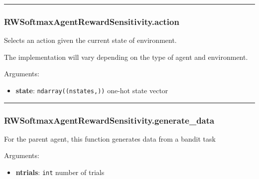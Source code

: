 \begin{center}\rule{0.5\linewidth}{\linethickness}\end{center}

\hypertarget{rwsoftmaxagentrewardsensitivity.action}{%
\subsubsection{RWSoftmaxAgentRewardSensitivity.action}\label{rwsoftmaxagentrewardsensitivity.action}}

\begin{Shaded}
\begin{Highlighting}[]
\end{Highlighting}
\end{Shaded}

Selects an action given the current state of environment.

The implementation will vary depending on the type of agent and
environment.

Arguments:

\begin{itemize}
\tightlist
\item
  \textbf{state}: \texttt{ndarray((nstates,))} one-hot state vector
\end{itemize}

\begin{center}\rule{0.5\linewidth}{\linethickness}\end{center}

\hypertarget{rwsoftmaxagentrewardsensitivity.generate_data}{%
\subsubsection{RWSoftmaxAgentRewardSensitivity.generate\_data}\label{rwsoftmaxagentrewardsensitivity.generate_data}}

\begin{Shaded}
\begin{Highlighting}[]
\end{Highlighting}
\end{Shaded}

For the parent agent, this function generates data from a bandit task

Arguments:

\begin{itemize}
\tightlist
\item
  \textbf{ntrials}: \texttt{int} number of trials
\end{itemize}

